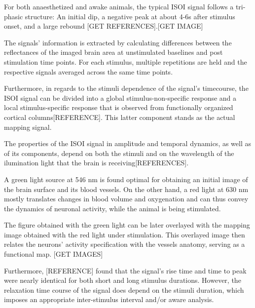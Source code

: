 For both anaesthetized and awake animals, the typical ISOI signal follows a tri-phasic structure: An initial dip, a negative peak at about 4-6s after stimulus onset, and a large rebound [GET REFERENCES].[GET IMAGE] 

The signals' information is extracted by calculating differences between the reflectances of the imaged brain area at unstimulated baselines and post stimulation time points. For each stimulus, multiple repetitions are held and the respective signals averaged across the same time points.

Furthermore, in regards to the stimuli dependence of the signal's timecourse, the ISOI signal can be divided into a global stimulus-non-specific response and a local stimulus-specific response that is observed from functionally organized cortical columns[REFERENCE]. This latter component stands as the actual mapping signal. 

The properties of the ISOI signal in amplitude and temporal dynamics, as well as of its components, depend on both the stimuli and on the wavelength of the ilumination light that the brain is receiving[REFERENCES].

A green light source at 546 nm is found optimal for obtaining an initial image of the brain surface and its blood vessels. On the other hand, a red light at 630 nm mostly translates changes in blood volume and oxygenation and can thus convey the dynamics of neuronal activity, while the animal is being stimulated. 

The figure obtained with the green light can be later overlayed with the mapping image obtained with the red light under stimulation. This overlayed image then relates the neurons' activity specification with the vessels anatomy, serving as a functional map. [GET IMAGES]

Furthermore, [REFERENCE] found that the signal's rise time and time to peak were nearly identical for both short and long stimulus durations. However, the  relaxation time course of the signal does depend on the stimuli duration, which imposes an appropriate inter-stimulus interval and/or aware analysis.